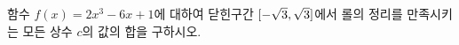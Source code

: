 함수 $f(x)=2x^3-6x+1$에 대하여 닫힌구간 $[-\sqrt{3}{,}\mkern3mu\mathopen{}\sqrt{3}]$에서 롤의 정리를 만족시키는 모든 상수 $c$의 값의 합을 구하시오.
